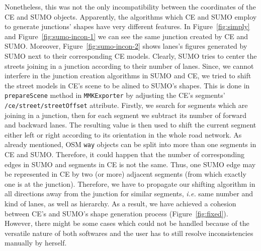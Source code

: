 Nonetheless, this was not the only incompatibility between the coordinates of the CE and SUMO objects. Apparently, the algorithms which CE and SUMO employ to generate junctions' shapes have very different features. In Figure~\ref{fig:simply} and Figure~\ref{fig:sumo-incon-1} we can see the same junction created by CE and SUMO. Moreover, Figure~\ref{fig:sumo-incon-2} shows lanes's figures generated by SUMO next to their corresponding CE models. Clearly, SUMO tries to center the streets joining in a junction according to their number of lanes. Since, we cannot interfere in the junction creation algorithms in SUMO and CE, we tried to shift the street models in CE's scene to be alined to SUMO's shapes. This is done in \texttt{prepareScene} method in \texttt{MMKExporter} by adjusting the CE's segments' \texttt{/ce/street/streetOffset} attribute. Firstly, we search for segments which are joining in a junction, then for each segment we subtract its number of forward and backward lanes. The resulting value is then used to shift the current segment either left or right according to its orientation in the whole road network. As already mentioned, OSM \texttt{way} objects can be split into more than one segments in CE and SUMO. Therefore, it could happen that the number of corresponding edges in SUMO and segments in CE is not the same. Thus, one SUMO edge may be represented in CE by two (or more) adjacent segments (from which exactly one is at the junction). Therefore, we have to propagate our shifting algorithm in all directions away from the junction for similar segments, \emph{i.e.} same number and kind of lanes, as well as hierarchy. As a result, we have achieved a cohesion between CE's and SUMO's shape generation process (Figure~\ref{fig:fixed}). However, there might be some cases which could not be handled because of the versatile nature of both softwares and the user has to still resolve inconsistencies manually by herself.\\

